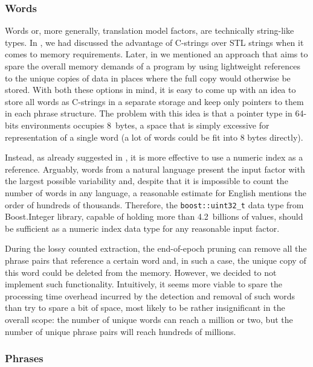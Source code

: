 \subsubsection*{Words}

Words or, more generally, translation model factors, are technically string-like types.
In , we had discussed the advantage of C-strings over STL strings when
it comes to memory requirements.
Later, in  we mentioned an approach that aims to spare the
overall memory demands of a program by using lightweight references to the unique copies of
data in places where the full copy would otherwise be stored.
With both these options in mind, it is easy to come up with an idea to store all words as
C-strings in a separate storage and keep only pointers to them in each phrase structure.
The problem with this idea is that a pointer type in 64-bits environments occupies
8~bytes, a space that is simply excessive for representation of a single word (a lot of
words could be fit into 8 bytes directly).

Instead, as already suggested in , it is more effective to
use a numeric index as a reference.
Arguably, words from a natural language present the input factor with the largest possible
variability and, despite that it is impossible to count the number of words in any language,
a reasonable estimate for English mentions the order of hundreds of thousands.
Therefore, the \texttt{boost::uint32_t} data type from Boost.Integer library, capable
of holding more than 4.2~billions of values, should be sufficient as a numeric index data
type for any reasonable input factor.

During the lossy counted extraction, the end-of-epoch pruning can remove all the phrase
pairs that reference a certain word and, in such a case, the unique copy of this word could
be deleted from the memory. However, we decided to not implement such functionality.
Intuitively, it seems more viable to spare the processing time overhead incurred by
the detection and removal of such words than try to spare a bit of space, most likely to
be rather insignificant in the overall scope: the number of unique words can reach
a million or two, but the number of unique phrase pairs will reach hundreds of millions.

\subsubsection*{Phrases}

